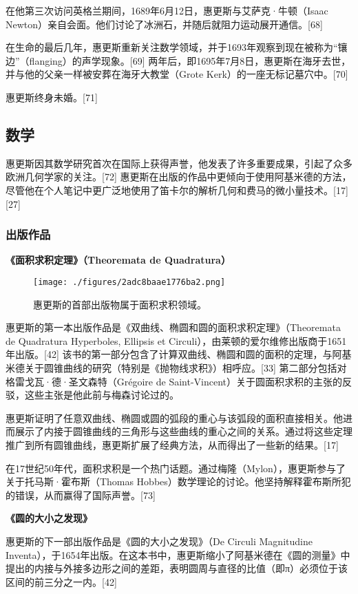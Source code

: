 在他第三次访问英格兰期间，1689年6月12日，惠更斯与艾萨克·牛顿（Isaac Newton）亲自会面。他们讨论了冰洲石，并随后就阻力运动展开通信。[68]

在生命的最后几年，惠更斯重新关注数学领域，并于1693年观察到现在被称为“镶边”（flanging）的声学现象。[69] 两年后，即1695年7月8日，惠更斯在海牙去世，并与他的父亲一样被安葬在海牙大教堂（Grote Kerk）的一座无标记墓穴中。[70]

惠更斯终身未婚。[71]
\subsection{数学}
惠更斯因其数学研究首次在国际上获得声誉，他发表了许多重要成果，引起了众多欧洲几何学家的关注。[72] 惠更斯在出版的作品中更倾向于使用阿基米德的方法，尽管他在个人笔记中更广泛地使用了笛卡尔的解析几何和费马的微小量技术。[17][27]
\subsubsection{出版作品}
\textbf{《面积求积定理》（Theoremata de Quadratura）}
\begin{figure}[ht]
\centering
\texttt{[image: ./figures/2adc8baae1776ba2.png]}
\caption{惠更斯的首部出版物属于面积求积领域。} \label{fig_HGS_7}
\end{figure}
惠更斯的第一本出版作品是《双曲线、椭圆和圆的面积求积定理》（Theoremata de Quadratura Hyperboles, Ellipsis et Circuli），由莱顿的爱尔维修出版商于1651年出版。[42] 该书的第一部分包含了计算双曲线、椭圆和圆的面积的定理，与阿基米德关于圆锥曲线的研究（特别是《抛物线求积》）相呼应。[33] 第二部分包括对格雷戈瓦·德·圣文森特（Grégoire de Saint-Vincent）关于圆面积求积的主张的反驳，这些主张是他此前与梅森讨论过的。

惠更斯证明了任意双曲线、椭圆或圆的弧段的重心与该弧段的面积直接相关。他进而展示了内接于圆锥曲线的三角形与这些曲线的重心之间的关系。通过将这些定理推广到所有圆锥曲线，惠更斯扩展了经典方法，从而得出了一些新的结果。[17]

在17世纪50年代，面积求积是一个热门话题。通过梅隆（Mylon），惠更斯参与了关于托马斯·霍布斯（Thomas Hobbes）数学理论的讨论。他坚持解释霍布斯所犯的错误，从而赢得了国际声誉。[73]

\textbf{《圆的大小之发现》}

惠更斯的下一部出版作品是《圆的大小之发现》（De Circuli Magnitudine Inventa），于1654年出版。在这本书中，惠更斯缩小了阿基米德在《圆的测量》中提出的内接与外接多边形之间的差距，表明圆周与直径的比值（即π）必须位于该区间的前三分之一内。[42]

